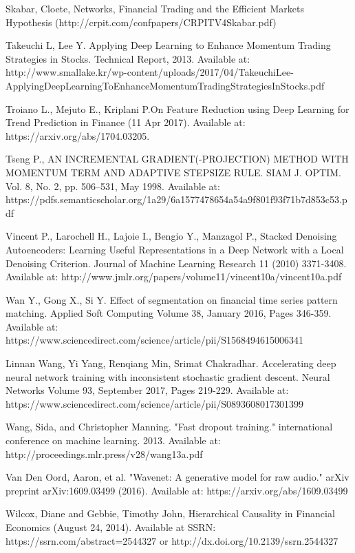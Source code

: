 \documentclass[a4paper,11pt,oneside]{article}
\theoremstyle{plain}
\theoremstyle{definition}
\begin{document}
\begin{thebibliography}{bibliography}
 Skabar, Cloete, Networks, Financial Trading and the Efficient Markets Hypothesis (http://crpit.com/confpapers/CRPITV4Skabar.pdf)

Takeuchi L, Lee Y. Applying Deep Learning to Enhance Momentum Trading Strategies in 
Stocks. Technical Report, 2013. Available at: http://www.smallake.kr/wp-content/uploads/2017/04/TakeuchiLee-ApplyingDeepLearningToEnhanceMomentumTradingStrategiesInStocks.pdf

Troiano L., Mejuto E., Kriplani P.On Feature Reduction using Deep Learning
for Trend Prediction in Finance (11 Apr 2017).  Available at: 
https://arxiv.org/abs/1704.03205.

Tseng P., AN INCREMENTAL GRADIENT(-PROJECTION) METHOD
WITH MOMENTUM TERM AND ADAPTIVE STEPSIZE RULE. SIAM J. OPTIM.  Vol. 8, No. 2, pp. 506–531, May 
1998. Available at: https://pdfs.semanticscholar.org/1a29/6a1577478654a54a9f801f93f71b7d853c53.pdf

Vincent P., Larochell H., Lajoie I., Bengio Y., Manzagol P., Stacked Denoising Autoencoders: Learning Useful Representations in
a Deep Network with a Local Denoising Criterion. Journal of Machine Learning Research 11 (2010) 
3371-3408. Available at: http://www.jmlr.org/papers/volume11/vincent10a/vincent10a.pdf

Wan Y., Gong X., Si Y. Effect of segmentation on financial time series pattern 
matching. Applied Soft Computing Volume 38, January 2016, Pages 346-359. 
Available at: https://www.sciencedirect.com/science/article/pii/S1568494615006341

Linnan Wang,  Yi Yang, Renqiang Min, Srimat Chakradhar. Accelerating deep neural network training with 
inconsistent stochastic gradient descent. Neural Networks
Volume 93, September 2017, Pages 219-229. Available at: https://www.sciencedirect.com/science/article/pii/S0893608017301399

Wang, Sida, and Christopher Manning. "Fast dropout training." international conference on machine learning. 2013.
Available at: http://proceedings.mlr.press/v28/wang13a.pdf

Van Den Oord, Aaron, et al. "Wavenet: A generative model for raw audio." arXiv preprint arXiv:1609.03499 (2016).
Available at: https://arxiv.org/abs/1609.03499

Wilcox, Diane and Gebbie, Timothy John, Hierarchical Causality in Financial Economics (August 24, 2014). Available at SSRN: https://ssrn.com/abstract=2544327 or http://dx.doi.org/10.2139/ssrn.2544327


\end{thebibliography}
\end{document}
